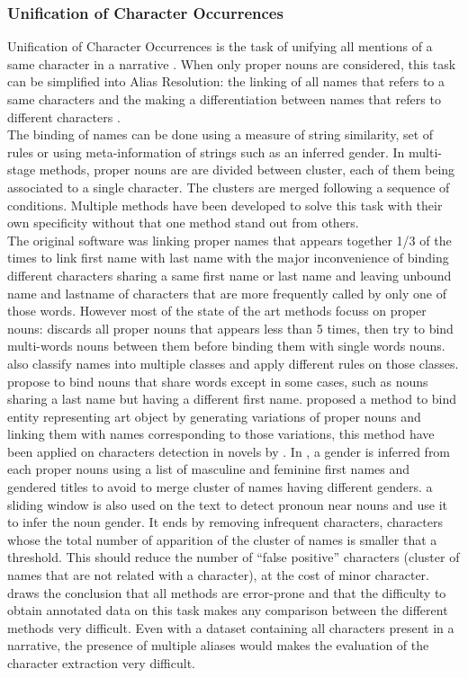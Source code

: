 \documentclass[a4paper, 12pt]{report}
\begin{document}
\subsubsection{Unification of Character Occurrences}
Unification of Character Occurrences is the task of unifying all mentions of a same character in a narrative \citep{fiction}. When only proper nouns are considered, this task can be simplified into Alias Resolution: the linking of all names that refers to a same characters and the making a differentiation between names that refers to different characters \citep{book_social}.\\
The binding of names can be done using a measure of string similarity, set of rules or using meta-information of strings such as an inferred gender. In multi-stage methods, proper nouns are are divided between cluster, each of them being associated to a single character. The clusters are merged following a sequence of conditions. Multiple methods have been developed to solve this task with their own specificity without that one method stand out from others.\\
The original software \citep{original} was linking proper names that appears together 1/3 of the times to link first name with last name with the major inconvenience of binding different characters sharing a same first name or last name and leaving unbound name and lastname of characters that are more frequently called by only one of those words. 
However most of the state of the art methods focuss on proper nouns: \cite{delete5} discards all proper nouns that appears less than 5 times, then try to bind multi-words nouns between them before binding them with single words nouns. \cite{structure_clustering} also classify names into multiple classes and apply different rules on those classes. \cite{character_meta} propose to bind nouns that share words except in some cases, such as nouns sharing a last name but having a different first name. \cite{variation} proposed a method to bind entity representing art object by generating variations of proper nouns and linking them with names corresponding to those variations, this method have been applied on characters detection in novels by \cite{quoted, character_meta}.  In \cite{delete5, structure_clustering, quoted},  a gender is inferred from each proper nouns using a list of masculine and feminine first names and gendered titles to avoid to merge cluster of names having different genders.\cite{ structure_clustering} a sliding window is also used on the text to detect pronoun near nouns and use it to infer the noun gender. It ends by removing infrequent characters, characters whose the total number of apparition of the cluster of names  is smaller that a threshold. This should reduce the number of ``false positive'' characters (cluster of names that are not related with a character), at the cost of minor character. \cite{delete5} draws the conclusion that all methods are error-prone and that the difficulty to obtain annotated data on this task makes any comparison between the different methods very difficult. Even with a dataset containing all characters present in a narrative, the presence of multiple aliases would makes the evaluation of the character extraction very difficult.  \\
\end{document}
